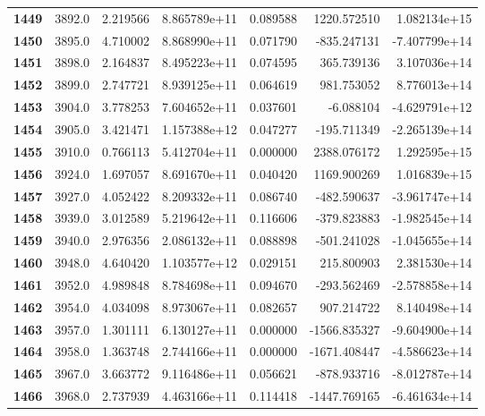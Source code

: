 \documentclass{report}[12pt]
\begin{document}
\begin{center}
\begin{tabular}{lrrrrrr}
\textbf{1449} &         3892.0 &   2.219566 &  8.865789e+11 &    0.089588 &  1220.572510 &  1.082134e+15 \\
\textbf{1450} &         3895.0 &   4.710002 &  8.868990e+11 &    0.071790 &  -835.247131 & -7.407799e+14 \\
\textbf{1451} &         3898.0 &   2.164837 &  8.495223e+11 &    0.074595 &   365.739136 &  3.107036e+14 \\
\textbf{1452} &         3899.0 &   2.747721 &  8.939125e+11 &    0.064619 &   981.753052 &  8.776013e+14 \\
\textbf{1453} &         3904.0 &   3.778253 &  7.604652e+11 &    0.037601 &    -6.088104 & -4.629791e+12 \\
\textbf{1454} &         3905.0 &   3.421471 &  1.157388e+12 &    0.047277 &  -195.711349 & -2.265139e+14 \\
\textbf{1455} &         3910.0 &   0.766113 &  5.412704e+11 &    0.000000 &  2388.076172 &  1.292595e+15 \\
\textbf{1456} &         3924.0 &   1.697057 &  8.691670e+11 &    0.040420 &  1169.900269 &  1.016839e+15 \\
\textbf{1457} &         3927.0 &   4.052422 &  8.209332e+11 &    0.086740 &  -482.590637 & -3.961747e+14 \\
\textbf{1458} &         3939.0 &   3.012589 &  5.219642e+11 &    0.116606 &  -379.823883 & -1.982545e+14 \\
\textbf{1459} &         3940.0 &   2.976356 &  2.086132e+11 &    0.088898 &  -501.241028 & -1.045655e+14 \\
\textbf{1460} &         3948.0 &   4.640420 &  1.103577e+12 &    0.029151 &   215.800903 &  2.381530e+14 \\
\textbf{1461} &         3952.0 &   4.989848 &  8.784698e+11 &    0.094670 &  -293.562469 & -2.578858e+14 \\
\textbf{1462} &         3954.0 &   4.034098 &  8.973067e+11 &    0.082657 &   907.214722 &  8.140498e+14 \\
\textbf{1463} &         3957.0 &   1.301111 &  6.130127e+11 &    0.000000 & -1566.835327 & -9.604900e+14 \\
\textbf{1464} &         3958.0 &   1.363748 &  2.744166e+11 &    0.000000 & -1671.408447 & -4.586623e+14 \\
\textbf{1465} &         3967.0 &   3.663772 &  9.116486e+11 &    0.056621 &  -878.933716 & -8.012787e+14 \\
\textbf{1466} &         3968.0 &   2.737939 &  4.463166e+11 &    0.114418 & -1447.769165 & -6.461634e+14 \\

\end{tabular}
\end{center}
\end{document}
